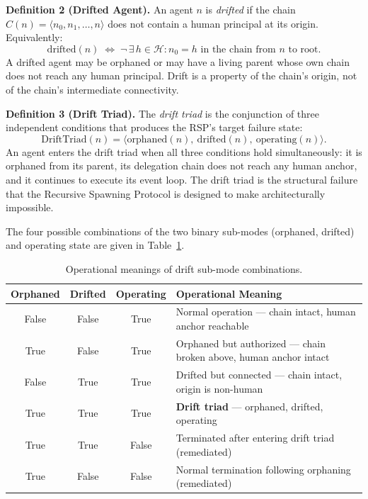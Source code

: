 \medskip
\noindent\textbf{Definition 2 (Drifted Agent).}
An agent $n$ is \emph{drifted} if the chain $C(n) = \langle n_0, n_1, \ldots, n \rangle$ does not contain a human principal at its origin. Equivalently:
\begin{equation}
\mathrm{drifted}(n) \;\iff\; \neg\,\exists\, h \in \mathcal{H} : n_0 = h \text{ in the chain from } n \text{ to root}.
\label{eq:rs-drifted-def}
\end{equation}
A drifted agent may be orphaned or may have a living parent whose own chain does not reach any human principal. Drift is a property of the chain's origin, not of the chain's intermediate connectivity.

\medskip
\noindent\textbf{Definition 3 (Drift Triad).}
The \emph{drift triad} is the conjunction of three independent conditions that produces the RSP's target failure state:
\begin{equation}
\mathrm{DriftTriad}(n) = \langle \mathrm{orphaned}(n),\ \mathrm{drifted}(n),\ \mathrm{operating}(n) \rangle.
\label{eq:rs-drift-triad}
\end{equation}
An agent enters the drift triad when all three conditions hold simultaneously: it is orphaned from its parent, its delegation chain does not reach any human anchor, and it continues to execute its event loop. The drift triad is the structural failure that the Recursive Spawning Protocol is designed to make architecturally impossible.

The four possible combinations of the two binary sub-modes (orphaned, drifted) and operating state are given in Table~\ref{tab:rs-drift-submodes}.

\begin{table}[h]
\centering
\begin{tabular}{c|c|c|p{5cm}}
\textbf{Orphaned} & \textbf{Drifted} & \textbf{Operating} & \textbf{Operational Meaning} \\ \hline
False & False & True  & Normal operation — chain intact, human anchor reachable \\
True  & False & True  & Orphaned but authorized — chain broken above, human anchor intact \\
False & True  & True  & Drifted but connected — chain intact, origin is non-human \\
True  & True  & True  & \textbf{Drift triad} — orphaned, drifted, operating \\
True  & True  & False & Terminated after entering drift triad (remediated) \\
True  & False & False & Normal termination following orphaning (remediated)
\end{tabular}
\caption{Operational meanings of drift sub-mode combinations.}
\label{tab:rs-drift-submodes}
\end{table}


